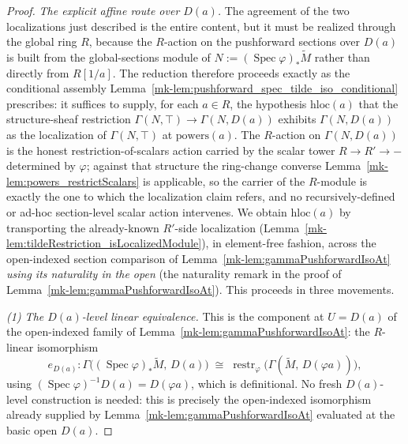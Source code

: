 \begin{proof}
  \medskip
  \emph{The explicit affine route over \(D(a)\).} The agreement of the two
  localizations just described is the entire content, but it must be realized
  through the global ring \(R\), because the \(R\)-action on the pushforward
  sections over \(D(a)\) is built from the global-sections module of
  \(N := (\operatorname{Spec}\varphi)_*\widetilde M\) rather than directly from
  \(R[1/a]\). The reduction therefore proceeds exactly as the conditional
  assembly Lemma~\ref{mk-lem:pushforward_spec_tilde_iso_conditional} prescribes: it
  suffices to supply, for each \(a \in R\), the hypothesis \(\mathrm{hloc}(a)\) that
  the structure-sheaf restriction \(\Gamma(N, \top) \to \Gamma(N, D(a))\) exhibits
  \(\Gamma(N, D(a))\) as the localization of \(\Gamma(N, \top)\) at
  \(\mathrm{powers}(a)\). The \(R\)-action on \(\Gamma(N, D(a))\) is the honest
  restriction-of-scalars action carried by the scalar tower \(R \to R' \to {-}\)
  determined by \(\varphi\); against that structure the ring-change converse
  Lemma~\ref{mk-lem:powers_restrictScalars} is applicable, so the carrier of the
  \(R\)-module is exactly the one to which the localization claim refers, and no
  recursively-defined or ad-hoc section-level scalar action intervenes.
  We obtain \(\mathrm{hloc}(a)\) by transporting the already-known \(R'\)-side
  localization (Lemma~\ref{mk-lem:tildeRestriction_isLocalizedModule}), in
  element-free fashion, across the open-indexed section comparison of
  Lemma~\ref{mk-lem:gammaPushforwardIsoAt} \emph{using its naturality in the open}
  (the naturality remark in the proof of
  Lemma~\ref{mk-lem:gammaPushforwardIsoAt}). This proceeds in three
  movements.

  \emph{(1) The \(D(a)\)-level linear equivalence.} This is the component at
  \(U = D(a)\) of the open-indexed family of
  Lemma~\ref{mk-lem:gammaPushforwardIsoAt}: the \(R\)-linear isomorphism
  \[
    e_{D(a)} : \Gamma\bigl((\operatorname{Spec}\varphi)_*\widetilde M,\, D(a)\bigr)
      \;\cong\;
      \operatorname{restr}_\varphi\bigl(\Gamma(\widetilde M,\, D(\varphi a))\bigr) ,
  \]
  using \((\operatorname{Spec}\varphi)^{-1}D(a) = D(\varphi a)\), which is
  definitional. No fresh \(D(a)\)-level construction is needed: this is precisely the
  open-indexed isomorphism already supplied by
  Lemma~\ref{mk-lem:gammaPushforwardIsoAt} evaluated at the basic open \(D(a)\).


\end{proof}
